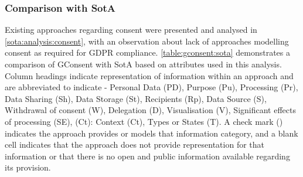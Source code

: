 \subsubsection{Comparison with SotA}
Existing approaches regarding consent were presented and analysed in \autoref{sota:analysis:consent}, with an observation about lack of approaches modelling consent as required for GDPR compliance.
\autoref{table:gconsent:sota} demonstrates a comparison of GConsent with SotA based on attributes used in this analysis.
Column headings indicate representation of information within an approach and are abbreviated to indicate - Personal Data (PD), Purpose (Pu), Processing (Pr), Data Sharing (Sh), Data Storage (St), Recipients (Rp), Data Source (S), Withdrawal of consent (W), Delegation (D), Visualisation (V), Significant effects of processing (SE), (Ct): Context (Ct), Types or States (T).
A check mark (\cmark) indicates the approach provides or models that information category, and a blank cell indicates that the approach does not provide representation for that information or that there is no open and public information available regarding its provision.
